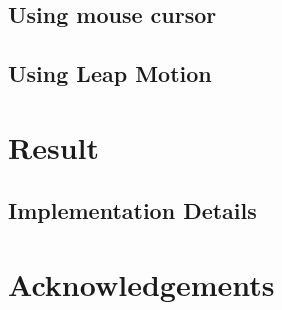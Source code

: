 \documentclass[tog]{acmsiggraph}
\begin{document}
\subsection{Using mouse cursor} 



\subsection{Using Leap Motion}



\section{Result} 

\subsection{Implementation Details} 




\section*{Acknowledgements}




\end{document}
